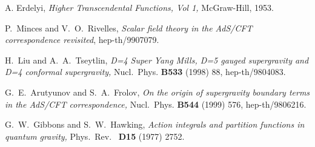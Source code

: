 \documentclass[a4paper,12pt]{article}
\begin{document}
\begin{thebibliography}{99}
 A. Erdelyi, {\em Higher Transcendental Functions,
Vol 1,} McGraw-Hill, 1953.

 P.~Minces and V.~O.~Rivelles, {\em Scalar field theory in
the AdS/CFT correspondence revisited}, hep-th/9907079.

 H.~Liu and A.~A.~Tseytlin, {\em D=4 Super Yang
Mills, D=5 gauged supergravity and D=4 conformal supergravity,}
Nucl.~Phys. {\bf B533} (1998) 88, hep-th/9804083.

 G.~E.~Arutyunov and S.~A.~Frolov, {\em On the origin
of supergravity boundary terms in the AdS/CFT correspondence,}
Nucl.~Phys. {\bf B544} (1999) 576, hep-th/9806216.

 G.~W.~Gibbons and S.~W.~Hawking, {\em Action integrals
and partition functions in quantum gravity,} Phys.~Rev.~ {\bf D15}
(1977) 2752.



\end{thebibliography}
\end{document}
